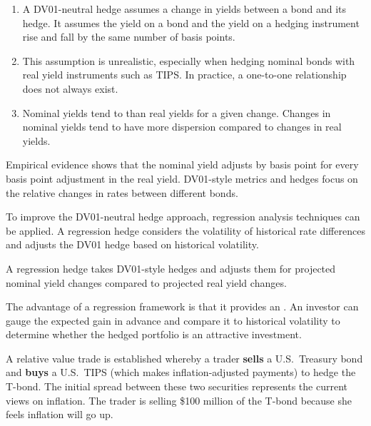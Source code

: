 \begin{mrtrapbox}[title={Limitations of a DV01-neutral hedge}]
\begin{enumerate}[label=\textbf{\alph*)}]
\item A DV01-neutral hedge assumes a  change in yields between a bond
      and its hedge. It assumes the yield on a bond and the yield on a hedging instrument rise
      and fall by the same number of basis points.
\item This assumption is unrealistic, especially when hedging nominal bonds with real yield
      instruments such as TIPS. In practice, a one-to-one relationship does not always exist.
\item Nominal yields tend to  than real yields for a given change. Changes
      in nominal yields tend to have more dispersion compared to changes in real yields.
\end{enumerate}
\end{mrtrapbox}

Empirical evidence shows that the nominal yield adjusts by  basis point for
every basis point adjustment in the real yield. DV01-style metrics and hedges focus on the
relative changes in rates between different bonds.

To improve the DV01-neutral hedge approach, regression analysis techniques can be applied. A
regression hedge considers the volatility of historical rate differences and adjusts the DV01
hedge based on historical volatility.


A regression hedge takes DV01-style hedges and adjusts them for projected nominal yield changes
compared to projected real yield changes.

\begin{mrkeybox}
The advantage of a regression framework is that it provides an . An investor can gauge the expected gain in advance and compare it to
historical volatility to determine whether the hedged portfolio is an attractive investment.
\end{mrkeybox}

\begin{mrexbox}[title={Example --- the T-bond versus TIPS relative value trade}]
A relative value trade is established whereby a trader \textbf{sells} a U.S.\ Treasury bond and
\textbf{buys} a U.S.\ TIPS (which makes inflation-adjusted payments) to hedge the T-bond. The
initial spread between these two securities represents the current views on inflation. The
trader is selling \$100 million of the T-bond because she feels inflation will go up.
\end{mrexbox}

